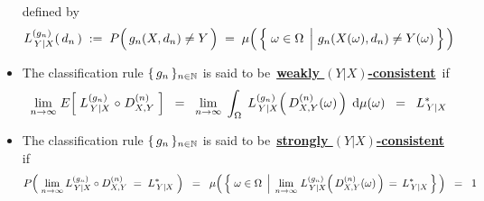 \begin{definition}
\begin{itemize}
\begin{equation*}
	\end{equation*}
	defined by
	\begin{equation*}
	L^{(g_{n})}_{\,Y \vert X}(\,d_{n}\,)
	\; := \;
		P\!\left(\, g_{n}(X,d_{n}) \overset{{\color{white}.}}{\neq} Y \,\right)
	\; = \;
		\mu\!\left(\,\left\{\,
			\left.\omega\overset{{\color{white}.}}{\in}\Omega\;\,\right\vert\,g_{n}(X(\omega),d_{n}) \neq Y(\omega)
			\,\right\}\,\right)
	\end{equation*}
\item
	The classification rule $\{\,g_{n}\,\}_{n\in\mathbb{N}}$ is said to be
	\,\underline{\textbf{weakly $(Y \vert X)$-consistent}}\, if
	\begin{equation*}
	\underset{n\rightarrow\infty}{\lim}\;
		E\!\left[\; L^{(g_{n})}_{\,Y \vert X} \overset{{\color{white}-}}{\circ} D^{(n)}_{X,Y} \;\right]
	\;\; = \;\;
	\underset{n\rightarrow\infty}{\lim}\;
		\int_{\Omega}\; L^{(g_{n})}_{\,Y \vert X}\!\left(\,D^{(n)}_{X,Y}(\omega)\,\right) \;\d\mu(\omega)
	\;\; = \;\;
		L^{*}_{\,Y \vert X}
	\end{equation*}
\item
	The classification rule $\{\,g_{n}\,\}_{n\in\mathbb{N}}$ is said to be
	\,\underline{\textbf{strongly $(Y \vert X)$-consistent}}\, if
	\begin{equation*}
	P\!\left(\;
		\underset{n\rightarrow\infty}{\lim}\,
		L^{(g_{n})}_{\,Y \vert X}\circ D^{(n)}_{X,Y} \;\overset{{\color{white}.}}{=}\; L^{*}_{\,Y \vert X}
	\;\right)
	\;\; = \;\;
		\mu\!\left(\,\left\{\,\left.
			\omega \overset{{\color{white}.}}{\in} \Omega
		\,\;\right\vert\;
			\underset{n\rightarrow\infty}{\lim}\;
			L^{(g_{n})}_{\,Y \vert X}\!\left(\,D^{(n)}_{X,Y}(\omega)\,\right) \,=\, L^{*}_{\,Y \vert X}	
		\,\right\}\,\right)
	\;\; = \;\;
		1
	\end{equation*}
\end{itemize}
\end{definition}


